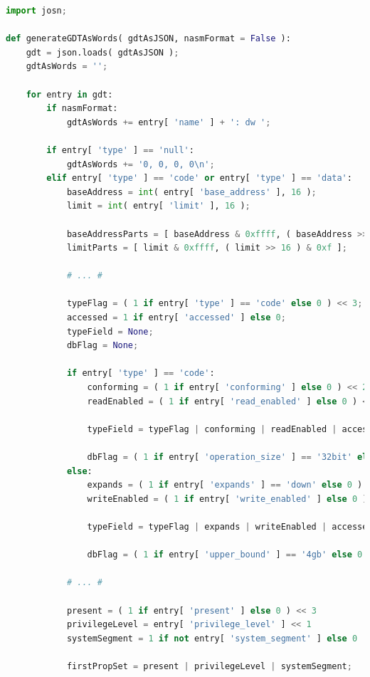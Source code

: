 \begin{lstlisting}[language=Python]
import josn;

def generateGDTAsWords( gdtAsJSON, nasmFormat = False ):
    gdt = json.loads( gdtAsJSON );
    gdtAsWords = '';
    
    for entry in gdt:
        if nasmFormat:
            gdtAsWords += entry[ 'name' ] + ': dw ';
                
        if entry[ 'type' ] == 'null':
            gdtAsWords += '0, 0, 0, 0\n';
        elif entry[ 'type' ] == 'code' or entry[ 'type' ] == 'data':
            baseAddress = int( entry[ 'base_address' ], 16 );
            limit = int( entry[ 'limit' ], 16 );
            
            baseAddressParts = [ baseAddress & 0xffff, ( baseAddress >> 16 ) & 0xff, ( baseAddress >> 24 ) & 0xff ]
            limitParts = [ limit & 0xffff, ( limit >> 16 ) & 0xf ];
            
            # ... #
            
            typeFlag = ( 1 if entry[ 'type' ] == 'code' else 0 ) << 3;
            accessed = 1 if entry[ 'accessed' ] else 0;
            typeField = None;
            dbFlag = None;
            
            if entry[ 'type' ] == 'code':
                conforming = ( 1 if entry[ 'conforming' ] else 0 ) << 2;
                readEnabled = ( 1 if entry[ 'read_enabled' ] else 0 ) << 1;
                
                typeField = typeFlag | conforming | readEnabled | accessed;
                
                dbFlag = ( 1 if entry[ 'operation_size' ] == '32bit' else 0 ) << 2
            else:
                expands = ( 1 if entry[ 'expands' ] == 'down' else 0 ) << 2;
                writeEnabled = ( 1 if entry[ 'write_enabled' ] else 0 ) << 1;
                
                typeField = typeFlag | expands | writeEnabled | accessed;
                
                dbFlag = ( 1 if entry[ 'upper_bound' ] == '4gb' else 0 ) << 2
                
            # ... #
            
            present = ( 1 if entry[ 'present' ] else 0 ) << 3
            privilegeLevel = entry[ 'privilege_level' ] << 1
            systemSegment = 1 if not entry[ 'system_segment' ] else 0
            
            firstPropSet = present | privilegeLevel | systemSegment;
            

\end{lstlisting}
